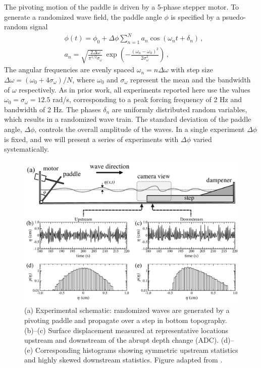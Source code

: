 \documentclass[11pt]{article}
\newcommand{\omavg}{\omega_0}
\newcommand{\omsig}{\sigma_{\omega}}
\newcommand{\Dphi}{\Delta \phi}
\begin{document}
The pivoting motion of the paddle is driven by a 5-phase stepper motor. To generate a randomized wave field, the paddle angle $\phi$ is specified by a psuedo-random signal
\begin{align}
\label{PaddleAngle}
& \phi(t) = \phi_0 + \Dphi \sum_{n=1}^N a_n \cos(\omega_n t+\delta_n) \, , \\
\label{anEq}
& a_n = \sqrt{\frac{2 \Delta \omega}{\pi^{1/2} \omsig}} \, 
\exp \left( -\frac{(\omega_n - \omavg)^2}{2 \omsig^2} \right) \, ,
\end{align}
The angular frequencies are evenly spaced $\omega_n = n  \Delta \omega$ with step size $ \Delta \omega = (\omavg+4 \omsig)/N$, where $\omavg$ and $\omsig$ represent the mean and the bandwidth of $\omega$ respectively. As in prior work, all experiments reported here use the values $\omavg = \omsig = 12.5$ rad/s, corresponding to a peak forcing frequency of 2 Hz and bandwidth of 2 Hz. The phases $\delta_n$ are uniformly distributed random variables, which results in a randomized wave train. The standard deviation of the paddle angle, $\Dphi$, controls the overall amplitude of the waves. In a single experiment $\Dphi$ is fixed, and we will present a series of experiments with $\Dphi$ varied systematically. 

\begin{figure}%
\begin{center}
\includegraphics[width = 0.80 \linewidth]{Figs/ExpDiagStats.pdf}
\caption{
(a) Experimental schematic: randomized waves are generated by a pivoting paddle and propagate over a step in bottom topography.
(b)--(c) Surface displacement measured at representative locations upstream and downstream of the abrupt depth change (ADC). (d)--(e) Corresponding histograms showing symmetric upstream statistics and highly skewed downstream statistics. Figure adapted from \cite{bolles2019}.}
\label{ExpDiagStats}
\end{center}
\end{figure}
 
\end{document}
